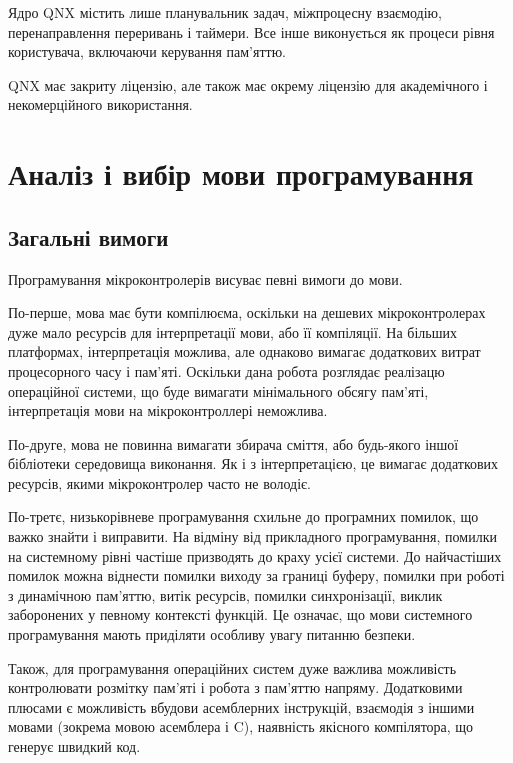 \documentclass[oneside,14pt,a4paper,final]{myextreport}
\begin{document}
Ядро QNX містить лише планувальник задач, міжпроцесну взаємодію, перенаправлення переривань і таймери. Все інше виконується як процеси рівня користувача, включаючи керування пам'яттю.

QNX має закриту ліцензію, але також має окрему ліцензію для академічного і некомерційного використання\cite{qnx:noncommercial}.


\chapter{Аналіз і вибір мови програмування}

\newcommand\LangC{C}

\section{Загальні вимоги}

Програмування мікроконтролерів висуває певні вимоги до мови.

По-перше, мова має бути компілюєма, оскільки на дешевих мікроконтролерах дуже мало ресурсів для інтерпретації мови, або її компіляції. На більших платформах, інтерпретація можлива, але однаково вимагає додаткових витрат процесорного часу і пам'яті. Оскільки дана робота розглядає реалізацю операційної системи, що буде вимагати мінімального обсягу пам'яті, інтерпретація мови на мікроконтроллері неможлива.

По-друге, мова не повинна вимагати збирача сміття, або будь-якого іншої бібліотеки середовища виконання. Як і з інтерпретацією, це вимагає додаткових ресурсів, якими мікроконтролер часто не володіє.

По-третє, низькорівневе програмування схильне до програмних помилок, що важко знайти і виправити. На відміну від прикладного програмування, помилки на системному рівні частіше призводять до краху усієї системи. До найчастіших помилок можна віднести помилки виходу за границі буферу, помилки при роботі з динамічною пам'яттю, витік ресурсів, помилки синхронізації, виклик заборонених у певному контексті функцій. Це означає, що мови системного програмування мають приділяти особливу увагу питанню безпеки.

Також, для програмування операційних систем дуже важлива можливість контролювати розмітку пам'яті і робота з пам'яттю напряму. Додатковими плюсами є можливість вбудови асемблерних інструкцій, взаємодія з іншими мовами (зокрема мовою асемблера і \LangC{}), наявність якісного компілятора, що генерує швидкий код.
\end{document}
